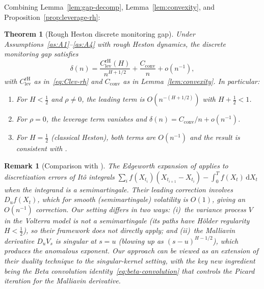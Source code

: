 \documentclass[12pt]{article}
\newtheorem{theorem}{Theorem}
\newtheorem{remark}{Remark}
\theoremstyle{definition}
\newcommand{\dd}{\mathrm{d}}
\begin{document}
Combining Lemma~\ref{lem:gap-decomp}, Lemma~\ref{lem:convexity},
and Proposition~\ref{prop:leverage-rh}:

\begin{theorem}[Rough Heston discrete monitoring gap]
\label{thm:rough-heston}
Under Assumptions~\ref{as:A1}--\ref{as:A4} with rough Heston
dynamics, the discrete monitoring gap satisfies
\begin{equation}\label{eq:rh-expansion}
  \delta(n)
  = \frac{C_{\mathrm{lev}}^{\mathrm{rH}}(H)}{n^{H+1/2}}
  + \frac{C_{\mathrm{conv}}}{n}
  + o(n^{-1}),
\end{equation}
with $C_{\mathrm{lev}}^{\mathrm{rH}}$ as in~\eqref{eq:Clev-rh}
and $C_{\mathrm{conv}}$ as in Lemma~\ref{lem:convexity}.
In particular:
\begin{enumerate}[label=(\roman*)]
\item For $H < \tfrac12$ and $\rho \neq 0$,
  the leading term is $O(n^{-(H+1/2)})$ with $H + \tfrac12 < 1$.
\item For $\rho = 0$, the leverage term vanishes and
  $\delta(n) = C_{\mathrm{conv}}/n + o(n^{-1})$.
\item For $H = \tfrac12$ (classical Heston), both terms are
  $O(n^{-1})$ and the result is consistent with
  \citet{BernardCui2014}.
\end{enumerate}
\end{theorem}

\begin{remark}[Comparison with \citet{AlosFukasawa2021}]
\label{rem:alos-comparison}
The Edgeworth expansion of \citet{AlosFukasawa2021} applies to
discretization errors of It\^o integrals $\sum_i f(X_{t_i})(X_{t_{i+1}}
- X_{t_i}) - \int_0^T f(X_t)\,\dd X_t$ when the integrand is a
semimartingale. Their leading correction involves $D_u f(X_t)$,
which for smooth (semimartingale) volatility is $O(1)$, giving an
$O(n^{-1})$ correction.
Our setting differs in two ways:
(i)~the variance process $V$ in the Volterra model is
\emph{not} a semimartingale (its paths have H\"older regularity
$H < \tfrac12$), so their framework does not directly apply; and
(ii)~the Malliavin derivative $D_u V_s$ is singular at $s = u$
(blowing up as $(s{-}u)^{H-1/2}$), which produces the anomalous
exponent.
Our approach can be viewed as an extension of their duality technique
to the singular-kernel setting, with the key new ingredient being
the Beta convolution identity~\eqref{eq:beta-convolution} that
controls the Picard iteration for the Malliavin derivative.
\end{remark}
\end{document}
